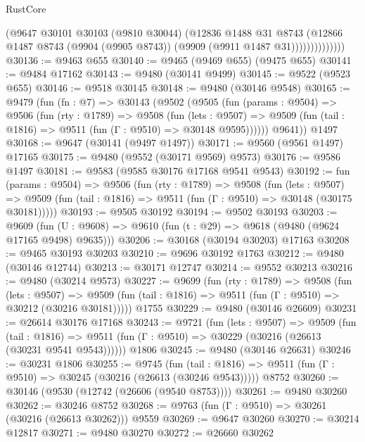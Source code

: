 \begin{lexlean}{RustCore}
\begin{coremodule}
                      (@9647
                        @30101
                        @30103
                        (@9810 @30044)
                        (@12836
                          @1488
                          @31
                          @8743
                          (@12866
                            @1487
                            @8743
                            (@9904 (@9905 @8743))
                            (@9909 (@9911 @1487 @31))))))))))))))
@30136 := @9463 @655
@30140 := @9465 (@9469 @655) (@9475 @655)
@30141 := @9484 @17162
@30143 := @9480 (@30141 @9499)
@30145 := @9522 (@9523 @655)
@30146 := @9518 @30145
@30148 := @9480 (@30146 @9548)
@30165 := @9479
    (fun (fn : @7) =>
    @30143
      (@9502
        (@9505
          (fun (params : @9504) =>
          @9506
            (fun (rty : @1789) =>
            @9508
              (fun (lets : @9507) =>
              @9509 (fun (tail : @1816) => @9511 (fun (Γ : @9510) => @30148 @9595))))))
        @9641))
    @1497
@30168 := @9647 (@30141 (@9497 @1497))
@30171 := @9560 (@9561 @1497) @17165
@30175 := @9480 (@9552 (@30171 @9569) @9573)
@30176 := @9586 @1497
@30181 := @9583 (@9585 @30176 @17168 @9541 @9543)
@30192 := fun (params : @9504) =>
  @9506
    (fun (rty : @1789) =>
    @9508
      (fun (lets : @9507) =>
      @9509 (fun (tail : @1816) => @9511 (fun (Γ : @9510) => @30148 (@30175 @30181)))))
@30193 := @9505 @30192
@30194 := @9502 @30193
@30203 := @9609
    (fun (U : @9608) => @9610 (fun (t : @29) => @9618 (@9480 (@9624 @17165 @9498) @9635)))
@30206 := @30168 (@30194 @30203) @17163
@30208 := @9465 @30193 @30203
@30210 := @9696 @30192 @1763
@30212 := @9480 (@30146 @12744)
@30213 := @30171 @12747
@30214 := @9552 @30213
@30216 := @9480 (@30214 @9573)
@30227 := @9699
    (fun (rty : @1789) =>
    @9508
      (fun (lets : @9507) =>
      @9509 (fun (tail : @1816) => @9511 (fun (Γ : @9510) => @30212 (@30216 @30181)))))
    @1755
@30229 := @9480 (@30146 @26609)
@30231 := @26614 @30176 @17168
@30243 := @9721
    (fun (lets : @9507) =>
    @9509
      (fun (tail : @1816) =>
      @9511 (fun (Γ : @9510) => @30229 (@30216 (@26613 (@30231 @9541 @9543))))))
    @1806
@30245 := @9480 (@30146 @26631)
@30246 := @30231 @1806
@30255 := @9745
    (fun (tail : @1816) => @9511 (fun (Γ : @9510) => @30245 (@30216 (@26613 (@30246 @9543)))))
    @8752
@30260 := @30146 (@9530 (@12742 (@26606 (@9540 @8753))))
@30261 := @9480 @30260
@30262 := @30246 @8752
@30268 := @9763 (fun (Γ : @9510) => @30261 (@30216 (@26613 @30262))) @9559
@30269 := @9647 @30260
@30270 := @30214 @12817
@30271 := @9480 @30270
@30272 := @26660 @30262

\end{coremodule}
\end{lexlean}
